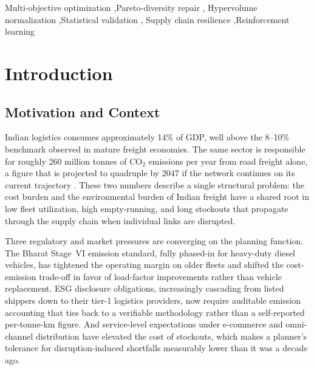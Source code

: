 \documentclass[review,preprint,authoryear,12pt]{elsarticle}
\newcommand{\COtwo}{\ensuremath{\mathrm{CO}_{2}}}
\begin{document}
\begin{frontmatter}
\begin{keyword}
Multi-objective optimization \sep Pareto-diversity repair \sep
Hypervolume normalization \sep Statistical validation \sep
Supply chain resilience \sep Reinforcement learning
\end{keyword}

\end{frontmatter}

\linenumbers

\section{Introduction}
\label{sec:introduction}

\subsection{Motivation and Context}

Indian logistics consumes approximately 14\% of GDP, well above the
8--10\% benchmark observed in mature freight economies. The same
sector is responsible for roughly 260 million tonnes of \COtwo{}
emissions per year from road freight alone, a figure that is projected
to quadruple by 2047 if the network continues on its current
trajectory \citep{niti_rmi_2021_freight}. These two numbers describe a
single structural problem: the cost burden and the environmental burden
of Indian freight have a shared root in low fleet utilization, high
empty-running, and long stockouts that propagate through the supply
chain when individual links are disrupted.

Three regulatory and market pressures are converging on the planning
function. The Bharat Stage~VI emission standard, fully phased-in for
heavy-duty diesel vehicles, has tightened the operating margin on
older fleets and shifted the cost-emission trade-off in favor of
load-factor improvements rather than vehicle replacement. ESG
disclosure obligations, increasingly cascading from listed shippers
down to their tier-1 logistics providers, now require auditable
emission accounting that ties back to a verifiable methodology rather
than a self-reported per-tonne-km figure. And service-level
expectations under e-commerce and omni-channel distribution have
elevated the cost of stockouts, which makes a planner's tolerance for
disruption-induced shortfalls measurably lower than it was a decade
ago.
\end{document}
